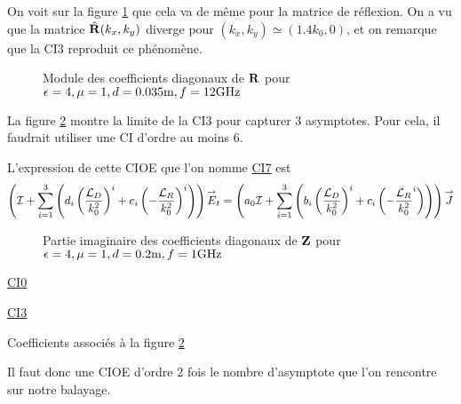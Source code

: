       On voit sur la figure \ref{fig:reflex_fourier:plan:soudais:hoibc} que cela va de même pour la matrice de réflexion. On a vu que la matrice \(\hat{\mathbf{R}}(k_x,k_y)\) diverge pour \((k_x,k_y)\simeq(1.4k_0,0)\), et on remarque que la CI3 reproduit ce phénomène.
      \begin{figure}[!hbt]
          \centering
          
          \caption[CIOE sur empilement de P.~Soudais p.~11]{Module des coefficients diagonaux de \(\mathbf{R}\) pour \(\epsilon = 4, \mu = 1, d=0.035\text{m}, f=12\text{GHz}\)}
          \label{fig:reflex_fourier:plan:soudais:hoibc}
      \end{figure}

      La figure \ref{fig:imp_fourier:plan:triple_asymptote:hoibc} montre la limite de la CI3 pour capturer 3 asymptotes. Pour cela, il faudrait utiliser une CI d'ordre au moins 6.

      L'expression de cette CIOE que l'on nomme \hyperlink{ci7}{CI7} est
      \begin{equation}
        \left({\mathcal{I}} + \sum_{i=1}^3 \left(d_{i} \left(\dfrac{{\mathcal{L}_D}}{k_0^2}\right)^i + e_{i} \left(-\dfrac{{\mathcal{L}_R}}{k_0^2}\right)^i \right)\right){\overset{\rightarrow}{E}}_t = \left(a_0 {\mathcal{I}} + \sum_{i=1}^3 \left(b_{i} \left(\dfrac{{\mathcal{L}_D}}{k_0^2}\right)^i + c_{i} \left(-\dfrac{{\mathcal{L}_R}}{k_0^2}^i\right) \right)\right){\overset{\rightarrow}{J}}
      \end{equation}

      \begin{figure}[!hbt]
          \centering
          
          \caption[CIOE sur empilement avec triple asymptote]{Partie imaginaire des coefficients diagonaux de \(\mathbf{Z}\) pour \(\epsilon = 4, \mu = 1, d=0.2\text{m}, f=1\text{GHz}\)}
          \label{fig:imp_fourier:plan:triple_asymptote:hoibc}
      \end{figure}
      \begin{table}[!hbt]
        \centering
        \begin{minipage}[t]{0.49\textwidth}
        \vspace{0pt}
        \centering
        \begin{coefftable}{\hyperlink{ci0}{CI0}}
          
        \end{coefftable}

        \begin{coefftable}{\hyperlink{ci3}{CI3}}
          
        \end{coefftable}
        \end{minipage}
        \caption{Coefficients associés à la figure \ref{fig:imp_fourier:plan:triple_asymptote:hoibc}}
        \label{tab:imp_fourier:plan:triple_asymptote:hoibc}
      \end{table}
      Il faut donc une CIOE d'ordre 2 fois le nombre d'asymptote que l'on rencontre sur notre balayage.

